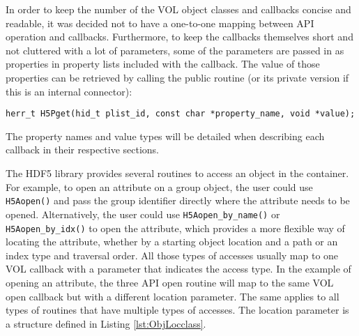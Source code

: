 In order to keep the number of the VOL object classes and callbacks
concise and readable, it was decided not to have a one-to-one mapping
between API operation and callbacks. Furthermore, to keep the
callbacks themselves short and not cluttered with a lot of parameters,
some of the parameters are passed in as properties in property lists
included with the callback. The value of those properties can be
retrieved by calling the public routine (or its private version if
this is an internal connector): 
\begin{lstlisting}
herr_t H5Pget(hid_t plist_id, const char *property_name, void *value);
\end{lstlisting}
The property names and value types will be detailed when describing
each callback in their respective sections.

The HDF5 library provides several routines to access an object in the
container. For example, to open an attribute on a group object, the
user could use \texttt{H5Aopen()} and pass the group identifier directly
where the attribute needs to be opened. Alternatively, the user could
use \texttt{H5Aopen\_by\_name()} or \texttt{H5Aopen\_by\_idx()} to open the
attribute, which provides a more flexible way of locating the
attribute, whether by a starting object location and a path or an
index type and traversal order. All those types of accesses usually
map to one VOL callback with a parameter that indicates the access
type. In the example of opening an attribute, the three API open
routine will map to the same VOL open callback but with a different
location parameter. The same applies to all types of routines that
have multiple types of accesses.  The location parameter is a
structure defined in Listing \ref{lst:ObjLocclass}.

\newpage

